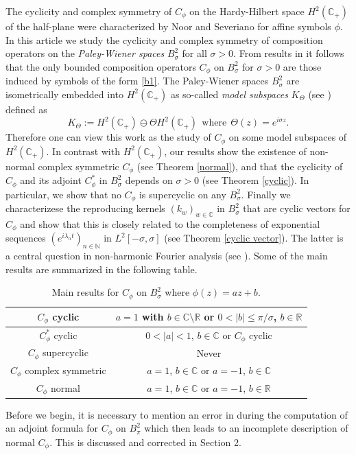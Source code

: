 \documentclass[11pt]{amsart}%
\numberwithin{equation}{section}
\theoremstyle{plain}
\theoremstyle{definition}
\theoremstyle{definition}
\begin{document}
The cyclicity and complex symmetry of $C_\phi$ on the Hardy-Hilbert space $H^2(\mathbb{C}_+)$ of the half-plane were characterized by  Noor and Severiano \cite{Noor} for affine symbols $\phi$. In this article we study the cyclicity and complex symmetry of composition operators on the \textit{Paley-Wiener spaces} $B^2_{\sigma}$ for all $\sigma>0$. From results in \cite{Ikeda} it follows that the only bounded composition operators $C_\phi$ on $B^2_{\sigma}$ for $\sigma>0$ are those induced by symbols of the form \eqref{b1}. The Paley-Wiener spaces $B^2_\sigma$ are isometrically embedded into $H^2(\mathbb{C}_+)$ as so-called \emph{model subspaces} $K_\Theta$ (see \cite[page 305]{Nikolski}) defined as
\[
K_\Theta:=H^2(\mathbb{C}_+)\ominus\Theta H^2(\mathbb{C}_+) \ \ \mathrm{where} \ \ \Theta(z)=e^{i\sigma z}.
\]
Therefore one can view this work as the study of $C_\phi$ on some model subspaces of $H^2(\mathbb{C}_+)$. In contrast with $H^2(\mathbb{C}_+)$, our results show the existence of non-normal complex symmetric $C_\phi$ (see Theorem \ref{normal}), and that the cyclicity of $C_\phi$ and its adjoint $C_\phi^*$ in $B^2_\sigma$ depends on $\sigma>0$ (see Theorem \ref{cyclic}). In particular, we show that no $C_\phi$ is supercyclic on any $B^2_\sigma$. Finally we characterizese the reproducing kernels $(k_w)_{w\in\mathbb{C}}$ in $B^2_\sigma$ that are cyclic vectors for $C_\phi$ and show that this is closely related to the completeness of exponential sequences $(e^{i\lambda_n t})_{n\in\mathbb{N}}$ in $L^2[-\sigma,\sigma]$ (see Theorem \ref{cyclic vector}). The latter is a central question in non-harmonic Fourier analysis (see \cite{young}). Some of the main results are summarized in the following table.

\begin{table}[h]
\centering
\caption{Main results for $C_\phi$ on $B^2_\sigma$ where $\phi(z)=az+b$.}
\label{tab:example}
\begin{tabular}{|c|c|} %

\hline
$C_\phi$ cyclic & $a=1$ with $b\in\mathbb{C}\setminus\mathbb{R}$ or $0<|b|\leq\pi/\sigma$, $b\in\mathbb{R}$ \\
\hline
$C^*_\phi$ cyclic & $0<|a|<1$, $b\in\mathbb{C}$ or $C_\phi$ cyclic \\
\hline
$C_\phi$ supercyclic & Never \\
\hline
$C_\phi$ complex symmetric & $a=1$, $b\in\mathbb{C}$ or $a=-1$, $b\in\mathbb{C}$  \\ 
\hline
$C_\phi$ normal & $a=1$, $b\in\mathbb{C}$ or $a=-1$, $b\in\mathbb{R}$  \\

\hline
\end{tabular}
\end{table}
Before we begin, it is necessary to mention an error in \cite{chacon2007composition} during the computation of an adjoint formula for $C_\phi$ on $B^2_\pi$ which then leads to an incomplete description of normal $C_\phi$. This is discussed and corrected in Section 2.
\end{document}
